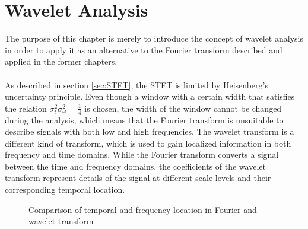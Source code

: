 \chapter{Wavelet Analysis} \label{ch12}
The purpose of this chapter is merely to introduce the concept of wavelet analysis in order to apply it as an alternative to the Fourier transform described and applied in the former chapters.\\
\\
As described in section \ref{sec:STFT}, the STFT is limited by Heisenberg's uncertainty principle. Even though a window with a certain width that satisfies the relation $\sigma_t^2 \sigma_\omega^2 = \frac{1}{4}$ is chosen, the width of the window cannot be changed during the analysis, which means that the Fourier transform is unsuitable to describe signals with both low and high frequencies. The wavelet transform is a different kind of transform, which is used to gain localized information in both frequency and time domains. While the Fourier transform converts a signal between the time and frequency domains, the coefficients of the wavelet transform represent details of the signal at different scale levels and their corresponding temporal location.
\begin{figure}[H]
\centering
{}
\caption{Comparison of temporal and frequency location in Fourier and wavelet transform }
\label{fig:wave}
\end{figure}

